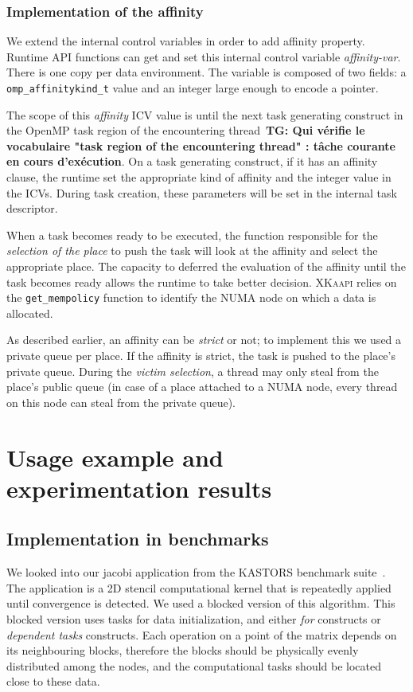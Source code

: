 \documentclass{Styles/llncs}
\newcommand{\kaapi}{\textsc{\mbox{XKaapi}}\xspace}
\newcommand{\TG}[1]{{\color{red}\bfseries TG: #1}}
\begin{document}
\subsubsection{Implementation of the affinity}
We extend the internal control variables in order to add affinity property. Runtime API functions can get and set this internal control variable \textit{affinity-var}. There is one copy per data environment. The variable is composed of two fields: a \texttt{omp\_affinitykind\_t} value and an integer large enough to encode a pointer.

The scope of this \textit{affinity} ICV value is until the next task generating construct in the OpenMP task region of the encountering thread~\cite{openmp40}\TG{Qui vérifie le vocabulaire "task region of the encountering thread" : tâche courante en cours d'exécution}. 
On a task generating construct, if it has an affinity clause, the runtime set the appropriate kind of affinity and the integer value in the ICVs.
During task creation, these parameters will be set in the internal task descriptor.

When a task becomes ready to be executed, the function responsible for the \textit{selection of the place} to push
the task will look at the affinity and select the appropriate place. The capacity to deferred the evaluation of the affinity until the task becomes ready allows the runtime to take better decision.
\kaapi relies on the \verb/get_mempolicy/ function to identify the NUMA node on which a data is allocated.

As described earlier, an affinity can be \emph{strict} or not; to implement this we used
a private queue per place. If the affinity is strict, the task is pushed to the place's private queue.
During the \textit{victim selection}, a thread may only steal from the place's
public queue (in case of a place attached to a  NUMA node, every thread on this node can steal from the private queue).

\section{Usage example and experimentation results}

\subsection{Implementation in benchmarks}

We looked into our jacobi application from the KASTORS benchmark suite~\cite{virouleau:hal-01081974}.
The application is a 2D stencil computational kernel that is repeatedly applied until
convergence is detected. We used a blocked version of this algorithm.
This blocked version uses tasks for data initialization, and either \emph{for} constructs or
\emph{dependent tasks} constructs.
Each operation on a point of the matrix depends on its neighbouring blocks,
therefore the blocks should be physically evenly distributed among the nodes,
and the computational tasks should be located close to these data.
\end{document}
